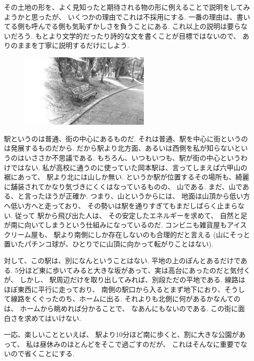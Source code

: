 
その土地の形を、よく見知ったと期待される物の形に例えることで説明をしてみようかと思ったが、
いくつかの理由でこれは不採用にする.
一番の理由は、書いてる側も呼んでる側も気恥ずかしさを負うことにある.
これ以上の説明は要らないだろう.
もとより文学的だったり詩的な文を書くことが目標ではないので、
ありのままを丁寧に説明するだけにしよう.

\begin{figure}
  \hspace*{-.1\textwidth}
\includegraphics[width=0.58\textwidth,bb=0 0 1600 900]{img/park1.jpg}
\end{figure}

駅というのは普通、街の中心にあるものだ.
それは普通、駅を中心に街というのは発展するものだから.
だから駅より北方面、あるいは西側を私が知らないというのはいささか不思議である.
もちろん、いつもいつも、駅が街の中心というわけではない.
私が高校に通うのに使っていた岡本駅は、言ってしまえば六甲山の裾にあって、
駅より北には山しか無い.
というか駅が位置するその場所も、綺麗に舗装されてかなり気づきにくくはなっているものの、
山である.
まだ、山である、と言ったほうが正確か.
つまり、山というからには、
地面は山頂から低い方へ低い方へと走っており、
その勢いは駅を通りすぎてもまだしばらく止まらない.
従って
駅から飛び出た人は、
その安定したエネルギーを求めて、
自然と足が南に向いてしまうという仕組みになっているのだ.
コンビニも雑貨屋もアイスクリーム屋も、
駅より南側にしか存在しないのも合理的だと言える
(山にそっと置いたパチンコ球が、ひとりでに山頂に向かって転がりことはない).

対して、この駅は、別になんということはない.
平地の上のぽんとあるだけである.
5分ほど東に歩いてみると大きな坂があって、実は高台にあったのだと気付くが、
しかし、
駅周辺だけを取り出してみれば、別段ただの平地である.
線路はほぼ東西に平行に走っており、
南側の駅口から入るとまず地下におり、そうして線路をくぐったのち、ホームに出る.
それよりも北側に何があるかなんてのは、
ホームから眺めれば分かることで、
なあんにもないのである.
この街に面白さを求めてはいけない.

一応、楽しいことといえば、
駅より10分ほど南に歩くと、割に大きな公園があって、
私は昼休みのほとんどをそこで過ごすのだが、
これはそんなに重要でないので省くことにする.

